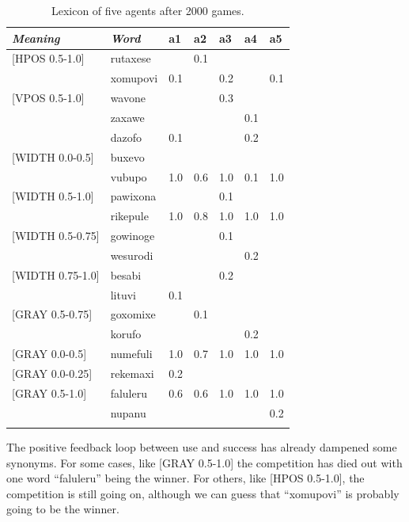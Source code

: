 \begin{table}
\begin{center}
\begin{tabular}{ l  l  l  l  l  l  l  }
\lsptoprule
{\itshape Meaning}&{\itshape Word}&{\bfshape  a1}&{\bfshape  a2}&{\bfshape  a3}&{\bfshape  a4}&{\bfshape  a5} \\ \midrule
{}[HPOS 0.5-1.0]&rutaxese& &0.1& & &\\ 
 & xomupovi&0.1& &0.2& &0.1\\ 
{}[VPOS 0.5-1.0]&wavone& & &0.3& &\\ 
 & zaxawe& & & &0.1& \\ 
 & dazofo&0.1& & &0.2&\\ 
{}[WIDTH 0.0-0.5]&buxevo& & & & & \\ 
 & vubupo&1.0&0.6&1.0&0.1&1.0\\ 
{}[WIDTH 0.5-1.0]&pawixona& & &0.1& & \\ 
 & rikepule&1.0&0.8&1.0&1.0&1.0\\ 
{}[WIDTH 0.5-0.75]&gowinoge& & &0.1& &  \\ 
 & wesurodi& & & &0.2&\\ 
{}[WIDTH 0.75-1.0]&besabi& & &0.2& & \\ 
 & lituvi&0.1& & & & \\ 
{}[GRAY 0.5-0.75]&goxomixe& &0.1& & & \\ 
 & korufo& & & &0.2&\\ 
{}[GRAY 0.0-0.5]&numefuli&1.0&0.7&1.0&1.0&1.0\\ 
{}[GRAY 0.0-0.25]&rekemaxi&0.2& & & & \\ 
{}[GRAY 0.5-1.0]&faluleru&0.6&0.6&1.0&1.0&1.0\\ 
 & nupanu& & & & &0.2 \\ 
\lspbottomrule
\end{tabular}
\caption{\label{tab:lex2000} Lexicon of five agents after 2000 games.}
\end{center}
\end{table}

The positive feedback loop between use and success
has already dampened some synonyms. For some cases, like [GRAY 0.5-1.0] the competition has died out 
with one word ``faluleru'' being the winner. 
For others, like [HPOS 0.5-1.0], the competition 
is still going on, although we can guess
that ``xomupovi'' is probably going to be the winner. 

